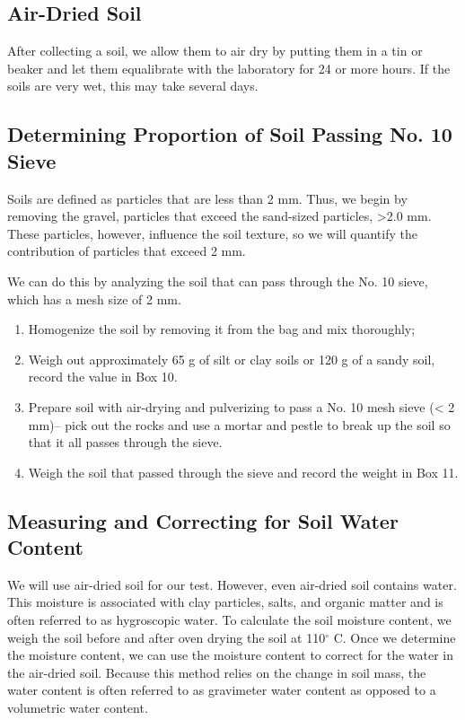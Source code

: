 \documentclass[12pt]{../SOP3_alpha}
\begin{document}
\subsection{Air-Dried Soil}

\NP After collecting a soil, we allow them to air dry by putting them in a tin or beaker and let them equalibrate with the laboratory for 24 or more hours. If the soils are very wet, this may take several days. 

\subsection{Determining Proportion of Soil Passing No. 10 Sieve}

\NP Soils are defined as particles that are less than 2 mm. Thus, we begin by removing the gravel, particles that exceed the sand-sized particles, >2.0 mm. These particles, however, influence the soil texture, so we will quantify the contribution of particles that exceed 2 mm. 

\NP We can do this by analyzing the soil that can pass through the No. 10 sieve, which has a mesh size of 2 mm.  

\begin{enumerate}
	\item Homogenize the soil by removing it from the bag and mix thoroughly;
	\item Weigh out approximately 65 g of silt or clay soils or 120 g of a sandy soil, record the value in Box 10. 
	\item Prepare soil with air-drying and pulverizing to pass a No. 10 mesh sieve (< 2 mm)-- pick out the rocks and use a mortar and pestle to break up the soil so that it all passes through the sieve. 
	\item Weigh the soil that passed through the sieve and record the weight in Box 11.
\end{enumerate}
  
\subsection{Measuring and Correcting for Soil Water Content}

\NP We will use air-dried soil for our test. However, even air-dried soil contains water. This moisture is associated with clay particles, salts, and organic matter and is often referred to as hygroscopic water. To calculate the soil moisture content, we weigh the soil before and after oven drying the soil at 110$^\circ$ C. Once we determine the moisture content, we can use the moisture content to correct for the water in the air-dried soil. Because this method relies on the change in soil mass, the water content is often referred to as gravimeter water content as opposed to a volumetric water content.
\end{document}
